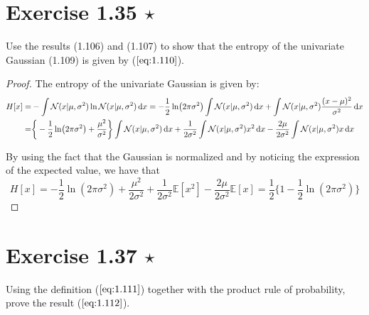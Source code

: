 \vspace{1em}

\section*{Exercise 1.35 $\star$}
Use the results (1.106) and (1.107) to show that the entropy of the 
univariate Gaussian (1.109) is given by ($\ref{eq:1.110}$).

\vspace{1em}

\begin{proof}
    The entropy of the univariate Gaussian is given by:
    \begin{align*}
        H[x] 
        =& -\int \mathcal{N}(x | \mu, \sigma^2) \ln \mathcal{N}(x | \mu, \sigma^2) \mathop{}\!\mathrm{d} x
        = -\frac{1}{2} \ln (2\pi \sigma^2) \int \mathcal{N}(x | \mu, \sigma^2) \mathop{}\!\mathrm{d} x 
            + \int \mathcal{N}(x | \mu, \sigma^2) \frac{(x - \mu)^2}{\sigma^2} \mathop{}\!\mathrm{d} x \\
        =& \bigg\{-\frac{1}{2} \ln (2\pi \sigma^2) + \frac{\mu^2}{\sigma^2} \bigg\}
            \int \mathcal{N}(x | \mu, \sigma^2) \mathop{}\!\mathrm{d} x 
            + \frac{1}{2\sigma^2} \int \mathcal{N}(x | \mu, \sigma^2) x^2 \mathop{}\!\mathrm{d} x 
            - \frac{2\mu}{2\sigma^2} \int \mathcal{N}(x | \mu, \sigma^2) x\mathop{}\!\mathrm{d} x
    \end{align*}

    By using the fact that the Gaussian is normalized and 
    by noticing the expression of the expected value, we have that
    \[
        H[x] 
        = -\frac{1}{2} \ln(2\pi \sigma^2) 
        + \frac{\mu^2}{2\sigma^2} 
        + \frac{1}{2\sigma^2} \mathbb{E}[x^2]
        - \frac{2\mu}{2\sigma^2} \mathbb{E}[x]
        = \frac{1}{2} \bigg\{1 - \frac{1}{2} \ln(2\pi \sigma^2)\bigg\} \label{eq:1.110}\tag{1.110}
    \]
\end{proof}

\section*{Exercise 1.37 $\star$}
Using the definition ($\ref{eq:1.111}$) together with the product rule
of probability, prove the result ($\ref{eq:1.112}$). 

\vspace{1em}


